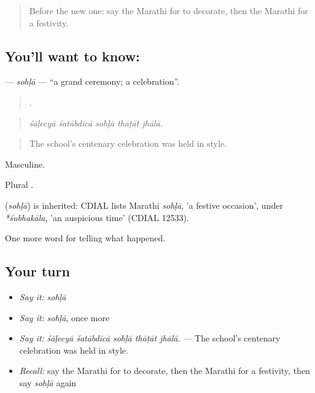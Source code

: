 \label{lesson:MR-C320-sohla}



\begin{quote}
Before the new one: say the Marathi for to decorate, then the Marathi for a festivity.
\end{quote}

\subsection*{You'll want to know: }
\textbf{} — \emph{sohḷā} — \textquotedblleft{}a grand ceremony; a celebration\textquotedblright{}.

\begin{quote}
    .
\end{quote}

\begin{quote}
\emph{śāḷecyā śatābdīcā sohḷā thāṭāt jhālā.}
\end{quote}

\begin{quote}
The school's centenary celebration was held in style.
\end{quote}

Masculine.

Plural .

\begin{cousinweb}
\textbf{} (\emph{sohḷā}) is inherited: CDIAL lists Marathi \emph{sohḷā}, 'a festive occasion', under \emph{*śubhakāla}, 'an auspicious time' (CDIAL 12533).
\end{cousinweb}

\begin{grammarlens}[title={What you've built}]
One more word for telling what happened.
\end{grammarlens}

\subsection*{Your turn}
\begin{itemize}
\raggedright
  \item \emph{Say it:} \emph{sohḷā}
  \item \emph{Say it:} \emph{sohḷā}, once more
  \item \emph{Say it:} \emph{śāḷecyā śatābdīcā sohḷā thāṭāt jhālā.} — The school's centenary celebration was held in style.
  \item \emph{Recall:} say the Marathi for to decorate, then the Marathi for a festivity, then say \emph{sohḷā} again
\end{itemize}

